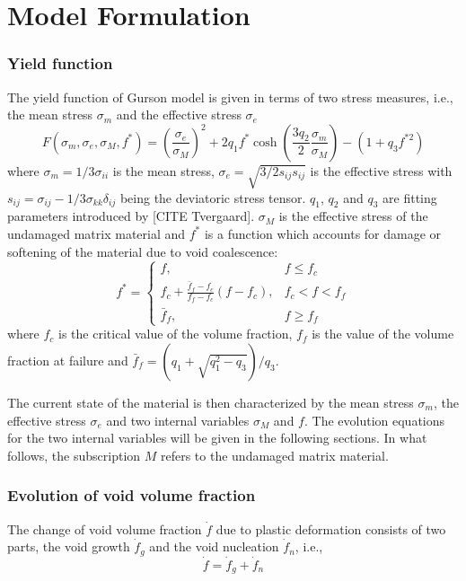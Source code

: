 \chapter{Model Formulation}
\label{model-form}

\subsection{Yield function}
The yield function of Gurson model is given in terms of two stress
measures, i.e., the mean stress $\sigma_m$ and the effective stress
$\sigma_e$
\begin{equation}\label{eq:yield}
  F(\sigma_m, \sigma_e, \sigma_M, f^*) =\left(
  \frac{\sigma_e}{\sigma_M} \right)^2 + 2q_1f^* \cosh \left(
  \frac{3q_2}{2}\frac{\sigma_m}{\sigma_M}\right) - \left( 1 + q_3 f^{*
    2}\right)
\end{equation}
where $\sigma_m = 1/3\sigma_{ii}$ is the mean stress, $\sigma_e =
\sqrt{3/2s_{ij}s_{ij}}$ is the effective stress with
$s_{ij}=\sigma_{ij} - 1/3\sigma_{kk}\delta_{ij}$ being the deviatoric
stress tensor. $q_1$, $q_2$ and $q_3$ are fitting parameters
introduced by [CITE Tvergaard]. $\sigma_M$ is the effective stress of
the undamaged matrix material and $f^{*}$ is a function which accounts
for damage or softening of the material due to void coalescence:
\begin{equation}
  f^*=
  \begin{cases}
    f, & f \leq f_c \\ f_c + \frac{\bar{f}_f - f_c}{f_f - f_c} \left(
    f - f_c \right) , & f_c < f < f_f \\ \bar{f}_f, & f \geq f_f
  \end{cases}
\end{equation}
where $f_c$ is the critical value of the volume fraction, $f_f$ is the
value of the volume fraction at failure and $\bar{f}_f = (q_1 +
\sqrt{q_1^2-q_3})/q_3$.

The current state of the material is then characterized by the mean
stress $\sigma_m$, the effective stress $\sigma_e$ and two internal
variables $\sigma_M$ and $f$. The evolution equations for the two
internal variables will be given in the following sections. In what
follows, the subscription $M$ refers to the undamaged matrix material.

\subsection{Evolution of void volume fraction}
The change of void volume fraction $\dot{f}$ due to plastic deformation consists of two parts, the void growth $\dot{f}_g$ and the void nucleation $\dot{f}_n$, i.e.,
\begin{equation}\label{eq:fdot}
\dot{f} = \dot{f}_g + \dot{f}_n
\end{equation}

